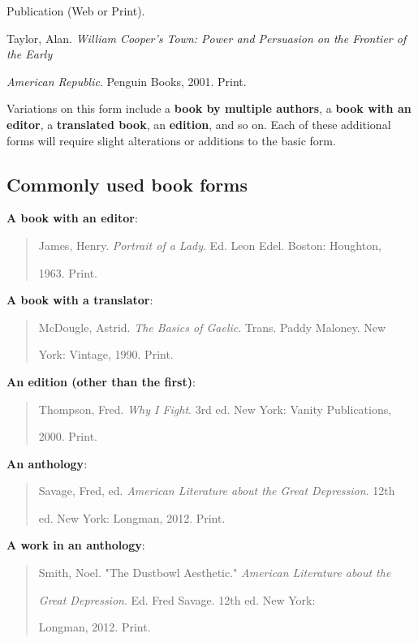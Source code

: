 \hspace{.4in}Publication (Web or Print).
\medskip

Taylor, Alan. \emph{William Cooper's Town: Power and Persuasion on the Frontier of the 
Early} 

\hspace{.4in}\emph{American Republic}. Penguin Books, 2001. Print.
\medskip

Variations on this form include a \textbf{book by multiple authors}, a \textbf {book with 
an editor}, a \textbf {translated book}, an \textbf {edition}, and so on. Each of these 
additional forms will require slight alterations or additions to the basic form. 

\subsection{Commonly used book forms}

\textbf{A book with an editor}: 
\begin{quote}
James, Henry. \emph{Portrait of a Lady}. Ed. Leon Edel. Boston: Houghton,

\hspace{.4in}1963. Print.
\end{quote}

\textbf{A book with a translator}: 
\begin{quote}
McDougle, Astrid. \emph{The Basics of Gaelic}. Trans. Paddy Maloney. New

\hspace{.4in}York: Vintage, 1990. Print.
\end{quote}


\textbf{An edition (other than the first)}:
\begin{quote}
Thompson, Fred. \emph{Why I Fight}. 3rd ed. New York: Vanity Publications,

\hspace{.4in}2000. Print.
\end{quote}

\textbf{An anthology}: 
\begin{quote}
Savage, Fred, ed. \emph{American Literature about the Great Depression}. 12th

\hspace{.4in}ed. New York: Longman, 2012. Print.
\end{quote}

\textbf{A work in an anthology}: 
\begin{quote}
Smith, Noel. "The Dustbowl Aesthetic." \emph{American Literature about the}

\hspace{.4in}\emph{Great Depression}. Ed. Fred Savage. 12th ed. New York:

\hspace{.4in}Longman,  2012. Print.
\end{quote}

